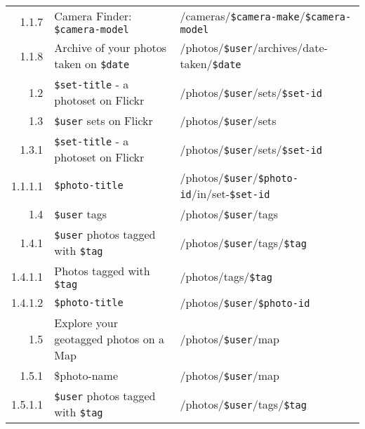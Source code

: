 \documentclass[12pt,a4paper]{article}
\newcommand{\var}[1]{\texttt{\${#1}}}
\begin{document}
\begin{table}[h!b!p!]
\begin{adjustwidth}{-6em}{-6em}
\begin{center}
\begin{small}
\begin{tabular}{|r|l|l|}
                  1.1.7 &
                  Camera Finder: \var{camera-model} &
                  /cameras/\var{camera-make}/\var{camera-model} \\

                  1.1.8 &
                  Archive of your photos taken on \var{date} &
                  /photos/\var{user}/archives/date-taken/\var{date} \\

                1.2 &
                \var{set-title} - a photoset on Flickr &
                /photos/\var{user}/sets/\var{set-id} \\

                1.3 &
                \var{user} sets on Flickr &
                /photos/\var{user}/sets \\

                  1.3.1 &
                  \var{set-title} - a photoset on Flickr &
                  /photos/\var{user}/sets/\var{set-id} \\

                    1.1.1.1 &
                    \var{photo-title} &
                    /photos/\var{user}/\var{photo-id}/in/set-\var{set-id} \\

                1.4 &
                \var{user} tags &
                /photos/\var{user}/tags \\

                  1.4.1 &
                  \var{user} photos tagged with \var{tag} &
                  /photos/\var{user}/tags/\var{tag} \\

                    1.4.1.1 &
                    Photos tagged with \var{tag} &
                    /photos/tags/\var{tag} \\

                    1.4.1.2 &
                    \var{photo-title} &
                    /photos/\var{user}/\var{photo-id} \\


                1.5 &
                Explore your geotagged photos on a Map &
                /photos/\var{user}/map \\

                  1.5.1 &
                  \$photo-name &
                  /photos/\var{user}/map \\

                    1.5.1.1 &
                    \var{user} photos tagged with \var{tag} &
                    /photos/\var{user}/tags/\var{tag} \\


\end{tabular}
\end{small}
\end{center}
\end{adjustwidth}
\end{table}
\end{document}
